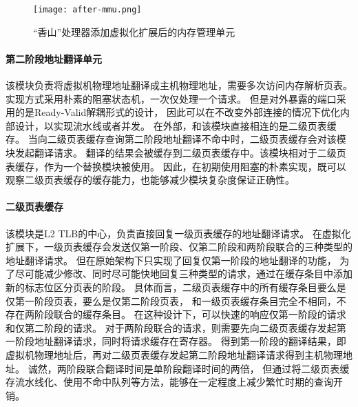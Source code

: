 \begin{figure}[htbp]
\centering
\texttt{[image: after-mmu.png]}
\caption{“香山”处理器添加虚拟化扩展后的内存管理单元}
\label{fig:after-mmu}
\end{figure}

\paragraph{第二阶段地址翻译单元}
该模块负责将虚拟机物理地址翻译成主机物理地址，需要多次访问内存解析页表。
实现方式采用朴素的阻塞状态机，一次仅处理一个请求。
但是对外暴露的端口采用的是Ready-Valid解耦形式的设计，
因此可以在不改变外部连接的情况下优化内部设计，以实现流水线或者并发。
在外部，和该模块直接相连的是二级页表缓存。
当向二级页表缓存查询第二阶段地址翻译不命中时，二级页表缓存会对该模块发起翻译请求。
翻译的结果会被缓存到二级页表缓存中。该模块相对于二级页表缓存，作为一个替换模块被使用。
因此，在初期使用阻塞的朴素实现，既可以观察二级页表缓存的缓存能力，也能够减少模块复杂度保证正确性。

\paragraph{二级页表缓存}
该模块是L2 TLB的中心，负责直接回复一级页表缓存的地址翻译请求。
在虚拟化扩展下，一级页表缓存会发送仅第一阶段、仅第二阶段和两阶段联合的三种类型的地址翻译请求。
但在原始架构下只实现了回复仅第一阶段的地址翻译的功能，
为了尽可能减少修改、同时尽可能快地回复三种类型的请求，通过在缓存条目中添加新的标志位区分页表的阶段。
具体而言，二级页表缓存中的所有缓存条目要么是仅第一阶段页表，要么是仅第二阶段页表，
和一级页表缓存条目完全不相同，不存在两阶段联合的缓存条目。
在这种设计下，可以快速的响应仅第一阶段的请求和仅第二阶段的请求。
对于两阶段联合的请求，则需要先向二级页表缓存发起第一阶段地址翻译请求，同时将请求缓存在寄存器。
得到第一阶段的翻译结果，即虚拟机物理地址后，再对二级页表缓存发起第二阶段地址翻译请求得到主机物理地址。
诚然，两阶段联合翻译时间是单阶段翻译时间的两倍，
但通过将二级页表缓存流水线化、使用不命中队列等方法，能够在一定程度上减少繁忙时期的查询开销。

